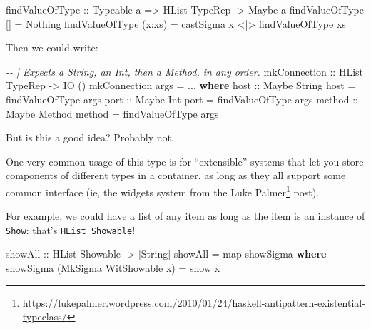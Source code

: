 \documentclass[]{article}
\newenvironment{Shaded}{}{}
\newcommand{\CommentTok}[1]{\textcolor[rgb]{0.38,0.63,0.69}{\textit{#1}}}
\newcommand{\DataTypeTok}[1]{\textcolor[rgb]{0.56,0.13,0.00}{#1}}
\newcommand{\FunctionTok}[1]{\textcolor[rgb]{0.02,0.16,0.49}{#1}}
\newcommand{\KeywordTok}[1]{\textcolor[rgb]{0.00,0.44,0.13}{\textbf{#1}}}
\newcommand{\NormalTok}[1]{#1}
\newcommand{\OperatorTok}[1]{\textcolor[rgb]{0.40,0.40,0.40}{#1}}
\newcommand{\OtherTok}[1]{\textcolor[rgb]{0.00,0.44,0.13}{#1}}
\renewcommand{\href}[2]{#2\footnote{\url{#1}}}
\begin{document}
\begin{Shaded}
\begin{Highlighting}[]
\OtherTok{findValueOfType ::} \DataTypeTok{Typeable}\NormalTok{ a }\OtherTok{=>} \DataTypeTok{HList} \DataTypeTok{TypeRep} \OtherTok{{-}>} \DataTypeTok{Maybe}\NormalTok{ a}
\NormalTok{findValueOfType []     }\OtherTok{=} \DataTypeTok{Nothing}
\NormalTok{findValueOfType (x}\OperatorTok{:}\NormalTok{xs) }\OtherTok{=}\NormalTok{ castSigma x }\OperatorTok{<|>}\NormalTok{ findValueOfType xs}
\end{Highlighting}
\end{Shaded}

Then we could write:

\begin{Shaded}
\begin{Highlighting}[]
\CommentTok{{-}{-} | Expects a String, an Int, then a Method, in any order.}
\OtherTok{mkConnection ::} \DataTypeTok{HList} \DataTypeTok{TypeRep} \OtherTok{{-}>} \DataTypeTok{IO}\NormalTok{ ()}
\NormalTok{mkConnection args }\OtherTok{=} \OperatorTok{...}
  \KeywordTok{where}
\OtherTok{    host ::} \DataTypeTok{Maybe} \DataTypeTok{String}
\NormalTok{    host }\OtherTok{=}\NormalTok{ findValueOfType args}
\OtherTok{    port ::} \DataTypeTok{Maybe} \DataTypeTok{Int}
\NormalTok{    port }\OtherTok{=}\NormalTok{ findValueOfType args}
\OtherTok{    method ::} \DataTypeTok{Maybe} \DataTypeTok{Method}
\NormalTok{    method }\OtherTok{=}\NormalTok{ findValueOfType args}
\end{Highlighting}
\end{Shaded}

But is this a good idea? Probably not.

One very common usage of this type is for ``extensible'' systems that let you
store components of different types in a container, as long as they all support
some common interface (ie, the widgets system from the
\href{https://lukepalmer.wordpress.com/2010/01/24/haskell-antipattern-existential-typeclass/}{Luke
Palmer} post).

For example, we could have a list of any item as long as the item is an instance
of \texttt{Show}: that's \texttt{HList\ Showable}!

\begin{Shaded}
\begin{Highlighting}[]
\OtherTok{showAll ::} \DataTypeTok{HList} \DataTypeTok{Showable} \OtherTok{{-}>}\NormalTok{ [}\DataTypeTok{String}\NormalTok{]}
\NormalTok{showAll }\OtherTok{=} \FunctionTok{map}\NormalTok{ showSigma}
  \KeywordTok{where}
\NormalTok{    showSigma (}\DataTypeTok{MkSigma} \DataTypeTok{WitShowable}\NormalTok{ x) }\OtherTok{=} \FunctionTok{show}\NormalTok{ x}
\end{Highlighting}
\end{Shaded}
\end{document}
